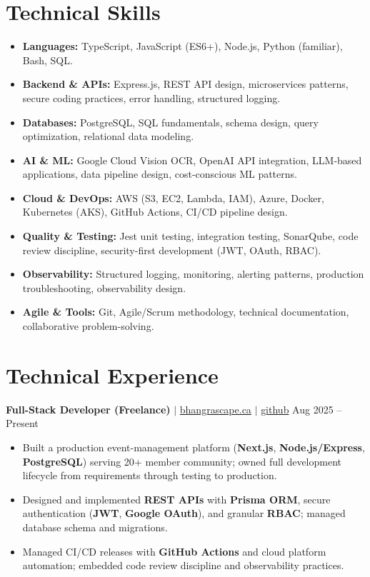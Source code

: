 \documentclass[11pt,a4paper]{article}
\begin{document}
\section{Technical Skills}
\begin{itemize}
    \item \textbf{Languages:} TypeScript, JavaScript (ES6+), Node.js, Python (familiar), Bash, SQL.
    \item \textbf{Backend \& APIs:} Express.js, REST API design, microservices patterns, secure coding practices, error handling, structured logging.
    \item \textbf{Databases:} PostgreSQL, SQL fundamentals, schema design, query optimization, relational data modeling.
    \item \textbf{AI \& ML:} Google Cloud Vision OCR, OpenAI API integration, LLM-based applications, data pipeline design, cost-conscious ML patterns.
    \item \textbf{Cloud \& DevOps:} AWS (S3, EC2, Lambda, IAM), Azure, Docker, Kubernetes (AKS), GitHub Actions, CI/CD pipeline design.
    \item \textbf{Quality \& Testing:} Jest unit testing, integration testing, SonarQube, code review discipline, security-first development (JWT, OAuth, RBAC).
    \item \textbf{Observability:} Structured logging, monitoring, alerting patterns, production troubleshooting, observability design.
    \item \textbf{Agile \& Tools:} Git, Agile/Scrum methodology, technical documentation, collaborative problem-solving.
\end{itemize}

\section{Technical Experience}

\textbf{Full-Stack Developer (Freelance)} $|$ \href{https://bhangrascape.ca}{bhangrascape.ca} $|$ \href{https://github.com/bhat0155/bhangraescape}{\small github} \hfill Aug 2025 -- Present
\begin{itemize}
    \item Built a production event-management platform (\textbf{Next.js}, \textbf{Node.js/Express}, \textbf{PostgreSQL}) serving 20+ member community; owned full development lifecycle from requirements through testing to production.
    \item Designed and implemented \textbf{REST APIs} with \textbf{Prisma ORM}, secure authentication (\textbf{JWT}, \textbf{Google OAuth}), and granular \textbf{RBAC}; managed database schema and migrations.
    \item Managed CI/CD releases with \textbf{GitHub Actions} and cloud platform automation; embedded code review discipline and observability practices.
\end{itemize}
\end{document}
